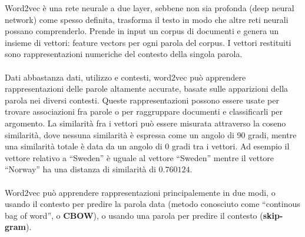 Word2vec è una rete neurale a due layer, sebbene non sia profonda (deep neural network) come spesso definita, trasforma il testo in modo che altre reti neurali possano comprenderlo. Prende in input un corpus di documenti e genera un insieme di vettori: feature vectors per ogni parola del corpus. I vettori restituiti sono rappresentazioni numeriche del contesto della singola parola. 
\\\\
Dati abbastanza dati, utilizzo e contesti, word2vec può apprendere rappresentazioni delle parole altamente accurate, basate sulle apparizioni della parola nei diversi contesti. Queste rappresentazioni possono essere usate per trovare associazioni fra parole o per raggruppare documenti e classificarli per argomento. La similarità fra i vettori può essere misurata attraverso la coseno similarità, dove nessuna similarità è espressa come un angolo di 90 gradi, mentre una similarità totale è data  da un angolo di 0 gradi tra i vettori. Ad esempio il vettore relativo a “Sweden” è uguale al vettore “Sweden” mentre il vettore “Norway” ha una distanza di similarità di $0.760124$.
\\\\
Word2vec può apprendere rappresentazioni principalemente in due modi, o usando il contesto per predire la parola data (metodo conosciuto come “continous bag of word”, o \textbf{CBOW}), o usando una parola per predire il contesto (\textbf{skip-gram}).

